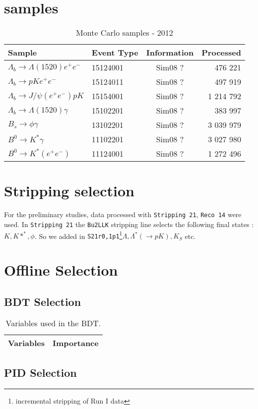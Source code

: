 \documentclass[11pt, oneside]{article}   	%
\begin{document}
\section {samples}
\label{sec:samples}
\begin{table}[h]
\centering
\begin{tabular}{llcr}
Sample& Event Type  & Information & Processed \\

\hline
$\Lambda_b\to \Lambda(1520) e^+e^-$ & 15124001 & Sim08 ? & 476 221 \\
$\Lambda_b\to pK e^+e^-$&15124011  &  Sim08 ? & 497 919 \\
$\Lambda_b\to J/\psi (e^+e^-)pK $&15154001  & Sim08 ?  & 1 214 792\\
$\Lambda_b\to \Lambda(1520) \gamma $ &15102201 &  Sim08 ? &383 997 \\
\hline 
$ B_s\to \phi \gamma$& 13102201 &  Sim08 ?  &   3 039 979\\

$B^0 \to K^* \gamma $ &11102201 &  Sim08 ? & 3 027 980\\

$ B^0 \to K^* (e^+e^-)$ &  11124001& Sim08 ?  &  1 272 496\\
\end{tabular}
\caption {Monte Carlo samples  - 2012 }
\end{table}

\section {Stripping selection}
\label{sec:stripping}
For the preliminary studies, data processed with  {\tt Stripping 21}, {\tt Reco 14} were used. 
In {\tt Stripping 21} the {\tt Bu2LLK}  stripping line selects the following  final states : $K, K*^*, \phi$. So we added in {\tt S21r0,1p1}\footnote{ incremental stripping of Run I data}$ \Lambda, \Lambda^*(\to pK ), K_S $ etc.



\section{Offline Selection}
\subsection{BDT Selection}
\label{sec:bdt}

\begin {table}[h]
\centering
\begin{tabular} {cc}
Variables & Importance \\
\hline

\end{tabular}
\caption{Variables used in the BDT.}
\end{table}


\subsection{PID Selection}
\label{sec:bdt}
\end{document}
